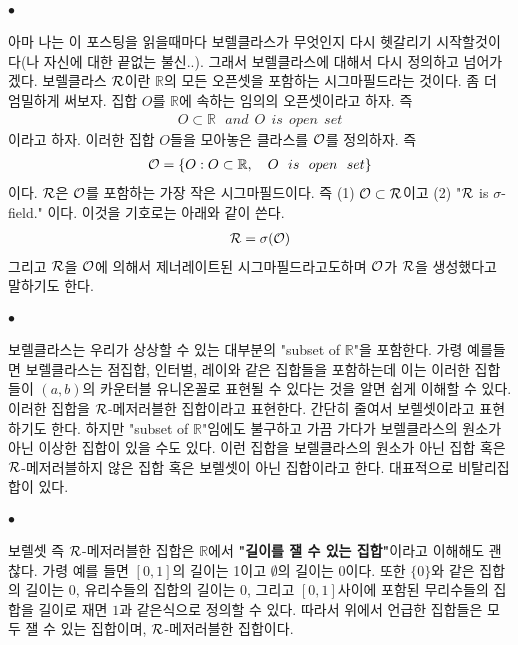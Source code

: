 \documentclass[12pt,oneside,english,a4paper]{article}
\def\ck{\paragraph{\Large$\bullet$}\Large}
\begin{document}
\ck 아마 나는 이 포스팅을 읽을때마다 보렐클라스가 무엇인지 다시 헷갈리기 시작할것이다(나 자신에 대한 끝없는 불신..). 그래서 보렐클라스에 대해서 다시 정의하고 넘어가겠다. 보렐클라스 $\cal R$이란 $\mathbb{R}$의 모든 오픈셋을 포함하는 시그마필드라는 것이다. 좀 더 엄밀하게 써보자. 집합 $O$를 $\mathbb{R}$에 속하는 임의의 오픈셋이라고 하자. 즉 
\begin{align*}
O \subset \mathbb{R} ~~~ and ~~ O ~~ is ~~ open ~~ set
\end{align*}
이라고 하자. 이러한 집합 $O$들을 모아놓은 클라스를 $\cal O$를 정의하자. 즉 
\begin{align*}
{\cal O}=\{O: O \subset \mathbb{R}, ~~~ O ~~ is ~~ open ~~ set \}
\end{align*}
이다. $\cal R$은 $\cal O$를 포함하는 가장 작은 시그마필드이다. 즉 (1) ${\cal O} \subset {\cal R}$이고 (2) "${\cal R}$ is $\sigma$-field." 이다. 이것을 기호로는 아래와 같이 쓴다. 
\begin{align*}
{\cal R}=\sigma({\cal O})
\end{align*}
그리고 ${\cal R}$을 $\cal O$에 의해서 제너레이트된 시그마필드라고도하며 $\cal O$가 $\cal R$을 생성했다고 말하기도 한다. 

\ck 보렐클라스는 우리가 상상할 수 있는 대부분의 "subset of $\mathbb{R}$"을 포함한다. 가령 예를들면 보렐클라스는 점집합, 인터벌, 레이와 같은 집합들을 포함하는데 이는 이러한 집합들이 $(a,b)$의 카운터블 유니온꼴로 표현될 수 있다는 것을 알면 쉽게 이해할 수 있다. 이러한 집합을 $\cal R$-메저러블한 집합이라고 표현한다. 간단히 줄여서 보렐셋이라고 표현하기도 한다. 하지만 "subset of $\mathbb{R}$"임에도 불구하고 가끔 가다가 보렐클라스의 원소가 아닌 이상한 집합이 있을 수도 있다. 이런 집합을 보렐클라스의 원소가 아닌 집합 혹은 $\cal R$-메저러블하지 않은 집합 혹은 보렐셋이 아닌 집합이라고 한다. 대표적으로 비탈리집합이 있다. 

\ck 보렐셋 즉 $\cal R$-메저러블한 집합은 $\mathbb{R}$에서 \textbf{"길이를 잴 수 있는 집합"}이라고 이해해도 괜찮다. 가령 예를 들면 $[0,1]$의 길이는 1이고 $\emptyset$의 길이는 0이다. 또한 $\{0\}$와 같은 집합의 길이는 0, 유리수들의 집합의 길이는 0, 그리고 $[0,1]$사이에 포함된 무리수들의 집합을 길이로 재면 $1$과 같은식으로 정의할 수 있다. 따라서 위에서 언급한 집합들은 모두 잴 수 있는 집합이며, $\cal R$-메저러블한 집합이다. 
\end{document}
